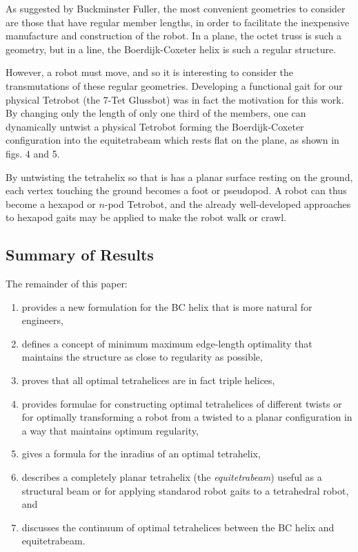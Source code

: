 \documentclass[10pt,final]{journals-1.0/asme2ej}
\begin{document}
As suggested by Buckminster Fuller, the most convenient geometries to
consider are those that have regular member lengths, in order to
facilitate the inexpensive manufacture and construction of the robot.
In a plane, the octet truss\cite{richard1961synergetic} is such a geometry, but in a line, the
Boerdijk-Coxeter helix is such a regular structure.

However, a robot must move, and so it is interesting to consider the
transmutations of these regular geometries. Developing a functional
gait for our physical Tetrobot (the 7-Tet Glussbot) was in fact the motivation
for this work.
By changing only the length of only one third of the members,
one can dynamically untwist a physical Tetrobot
forming the Boerdijk-Coxeter configuration into the equitetrabeam which rests flat on the plane,
as shown in figs. 4 and 5.

By untwisting the tetrahelix so that is has a planar surface resting on the ground,
each vertex touching the ground becomes a foot or pseudopod. A robot can thus
become a hexapod or $n$-pod Tetrobot, and the already well-developed approaches to
hexapod gaits may be applied to make the robot walk or crawl.

\subsection{Summary of Results}

The remainder of this  paper:
\begin{enumerate}
\item provides a new formulation for the BC helix that is more natural for engineers,
\item defines a concept of minimum maximum edge-length optimality that maintains
  the structure as close to regularity as possible,
  \item proves that all
    optimal tetrahelices are in fact triple helices,
\item provides formulae for constructing optimal tetrahelices of different twists or for optimally
    transforming a
    robot from a twisted to a planar configuration in a way that maintains optimum regularity,
\item gives a formula for the inradius of an optimal tetrahelix,
\item describes a completely planar tetrahelix (the \emph{equitetrabeam}) useful as
  a structural beam or for applying standarod robot gaits to a tetrahedral robot, and
\item discusses the continuum of optimal tetrahelices between the BC helix and equitetrabeam.
\end{enumerate}
\end{document}
